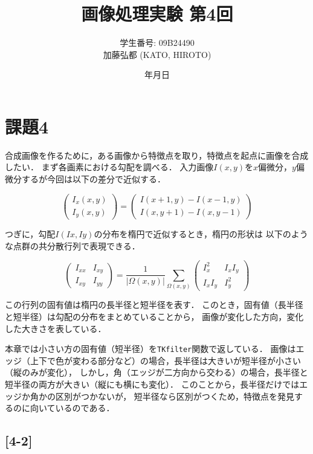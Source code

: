 \documentclass[autodetect-engine,dvi=dvipdfmx,ja=standard,
               a4j,11pt]{bxjsarticle}
\title{画像処理実験 第4回}
\author{学生番号: 09B24490\\
        加藤弘都 (KATO, HIROTO)}
\date{\number\year 年\number\month 月\number\day 日}
\begin{document}
\maketitle

\section{課題4} \label{sec:abstract}

合成画像を作るために，ある画像から特徴点を取り，特徴点を起点に画像を合成したい．
まず各画素における勾配を調べる．
入力画像$I(x,y)$を$x$偏微分，$y$偏微分するが今回は以下の差分で近似する．

\[
\begin{pmatrix}
I_x(x,y) \\
I_y(x,y)
\end{pmatrix}
=
\begin{pmatrix}
I(x+1,y)-I(x-1,y) \\
I(x,y+1)-I(x,y-1)
\end{pmatrix}
\]

つぎに，勾配$I(Ix,Iy)$の分布を楕円で近似するとき，楕円の形状は
以下のような点群の共分散行列で表現できる．

\[
\begin{pmatrix}
I_{xx} & I_{xy} \\
I_{xy} & I_{yy}
\end{pmatrix}
=
\frac{1}{|\Omega(x,y)|}
\sum_{\Omega(x,y)}
\begin{pmatrix}
I_x^2 & I_x I_y \\
I_x I_y & I_y^2
\end{pmatrix}
\]

この行列の固有値は楕円の長半径と短半径を表す．
このとき，固有値（長半径と短半径）は勾配の分布をまとめていることから，
画像が変化した方向，変化した大きさを表している．

本章では小さい方の固有値（短半径）を\verb|TKfilter|関数で返している．
画像はエッジ（上下で色が変わる部分など）の場合，長半径は大きいが短半径が小さい（縦のみが変化），
しかし，角（エッジが二方向から交わる）の場合，長半径と短半径の両方が大きい（縦にも横にも変化）．
このことから，長半径だけではエッジか角かの区別がつかないが，
短半径なら区別がつくため，特徴点を発見するのに向いているのである．


\subsection{[4-2]} \label{4-1}
\end{document}
